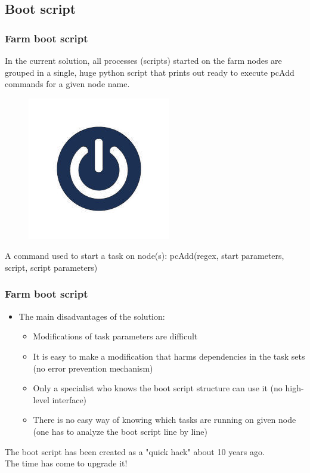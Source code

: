 \documentclass{beamer}
\begin{document}
\subsection{Boot script}
\begin{frame}
\frametitle{Farm boot script}

\noindent\begin{minipage}{0.6\textwidth}
In the current solution, all processes (scripts) started on the farm nodes are grouped in a single, huge python script that prints out ready to execute pcAdd commands for a given node name.
\end{minipage}%
\hfill%
\begin{minipage}{0.4\textwidth}\raggedleft
\begin{figure}
\includegraphics[scale=0.5]{images/on.jpeg}
\end{figure}
\end{minipage}
\vfill

\begin{block}{A command used to start a task on node(s):}
pcAdd(regex, start parameters, script, script parameters)
\end{block}

\end{frame}

\begin{frame}
\frametitle{Farm boot script}

\begin{itemize}
\item The main disadvantages of the solution:
\begin{itemize}
\item Modifications of task parameters are difficult
\item It is easy to make a modification that harms dependencies in the task sets (no error prevention mechanism)
\item Only a specialist who knows the boot script structure can use it (no high-level interface)
\item There is no easy way of knowing which tasks are running on given node (one has to analyze the boot script line by line)
\end{itemize}
\end{itemize}
\vfill
\begin{block}{The boot script has been created as a "quick hack" about 10 years ago. \\ The time has come to upgrade it!}
\end{block}
\end{frame}
\end{document}
